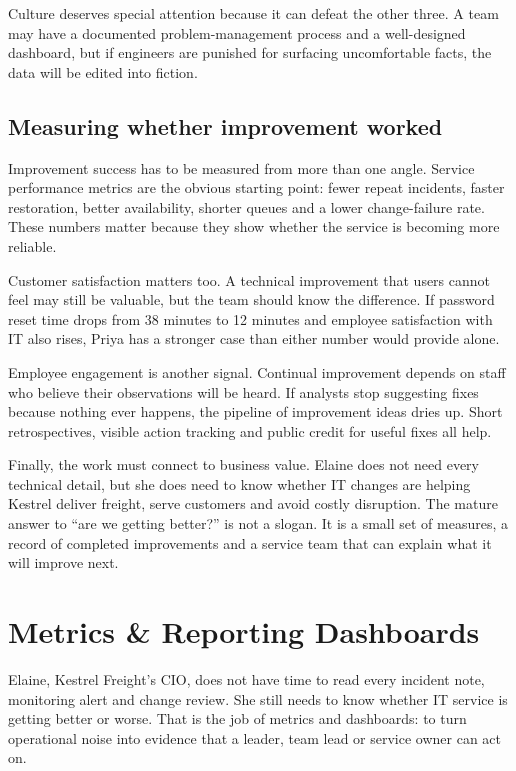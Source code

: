 Culture deserves special attention because it can defeat the other three. A team may have a documented problem-management process and a well-designed dashboard, but if engineers are punished for surfacing uncomfortable facts, the data will be edited into fiction.



\subsection{Measuring whether improvement worked}


Improvement success has to be measured from more than one angle. Service performance metrics are the obvious starting point: fewer repeat incidents, faster restoration, better availability, shorter queues and a lower change-failure rate. These numbers matter because they show whether the service is becoming more reliable.


Customer satisfaction matters too. A technical improvement that users cannot feel may still be valuable, but the team should know the difference. If password reset time drops from 38 minutes to 12 minutes and employee satisfaction with IT also rises, Priya has a stronger case than either number would provide alone.


Employee engagement is another signal. Continual improvement depends on staff who believe their observations will be heard. If analysts stop suggesting fixes because nothing ever happens, the pipeline of improvement ideas dries up. Short retrospectives, visible action tracking and public credit for useful fixes all help.


Finally, the work must connect to business value. Elaine does not need every technical detail, but she does need to know whether IT changes are helping Kestrel deliver freight, serve customers and avoid costly disruption. The mature answer to ``are we getting better?'' is not a slogan. It is a small set of measures, a record of completed improvements and a service team that can explain what it will improve next.

\section{Metrics \& Reporting Dashboards}
Elaine, Kestrel Freight's CIO, does not have time to read every incident note, monitoring alert and change review. She still needs to know whether IT service is getting better or worse. That is the job of metrics and dashboards: to turn operational noise into evidence that a leader, team lead or service owner can act on.


